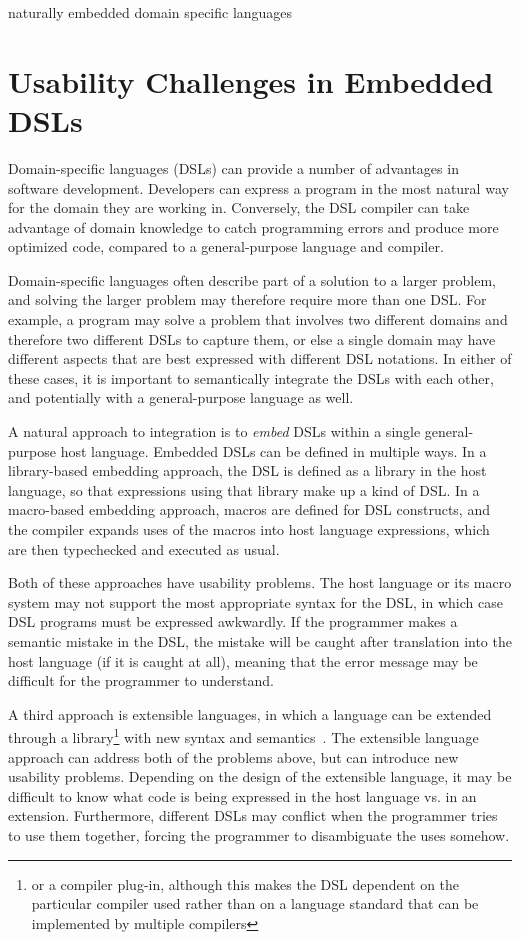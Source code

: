 \documentclass[preprint]{sigplanconf}
\begin{document}
\keywords
naturally embedded domain specific languages

\section{Usability Challenges in Embedded DSLs}

Domain-specific languages (DSLs) can provide a number of advantages in
software development. Developers can express a program in the most
natural way for the domain they are working in.  Conversely, the DSL
compiler can take advantage of domain knowledge to catch programming
errors and produce more optimized code, compared to a general-purpose
language and compiler.

Domain-specific languages often describe part of a solution to a
larger problem, and solving the larger problem may therefore require
more than one DSL.  For example, a program may solve a problem that
involves two different domains and therefore two different DSLs to
capture them, or else a single domain may have different aspects that
are best expressed with different DSL notations.  In either of these
cases, it is important to semantically integrate the DSLs with each
other, and potentially with a general-purpose language as well.

A natural approach to integration is to \textit{embed} DSLs within a
single general-purpose host language.
Embedded DSLs can be defined in multiple ways.  In a
library-based embedding approach, the DSL is defined as a library in
the host language, so that expressions using that library make up a
kind of DSL.  In a macro-based embedding approach, macros are defined
for DSL constructs, and the compiler expands uses of the macros into
host language expressions, which are then typechecked and executed
as usual.

Both of these approaches have usability problems.  The host language
or its macro system may not support the most appropriate syntax for
the DSL, in which case DSL programs must be expressed awkwardly.
If the programmer makes a semantic mistake in the DSL, the mistake
will be caught after translation into the host language (if it is
caught at all), meaning that the error message may be difficult for
the programmer to understand.

A third approach is extensible languages, in which a language
can be extended through a library\footnote{or a compiler plug-in,
although this makes the DSL dependent on the particular compiler
used rather than on a language standard that can be implemented
by multiple compilers} with new syntax and semantics~\cite{Erdweg:2011:SLL:2048147.2048199}.  The
extensible language approach can address both of the problems above,
but can introduce new usability problems.  Depending on the
design of the extensible language, it may be difficult to know
what code is being expressed in the host language vs. in an
extension.  Furthermore, different DSLs may conflict when the
programmer tries to use them together, forcing the programmer
to disambiguate the uses somehow.
\end{document}
